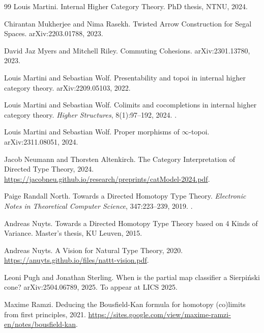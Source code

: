\documentclass[12pt]{article}
\begin{document}
\begin{thebibliography}{99}
Louis Martini.
\newblock Internal Higher Category Theory.
\newblock PhD thesis, NTNU, 2024.

Chirantan Mukherjee and Nima Rasekh.
\newblock Twisted Arrow Construction for Segal Spaces.
\newblock arXiv:2203.01788, 2023.

David Jaz Myers and Mitchell Riley.
\newblock Commuting Cohesions.
\newblock arXiv:2301.13780, 2023.

Louis Martini and Sebastian Wolf.
\newblock Presentability and topoi in internal higher category theory.
\newblock arXiv:2209.05103, 2022.

Louis Martini and Sebastian Wolf.
\newblock Colimits and cocompletions in internal higher category theory.
\newblock \emph{Higher Structures}, 8(1):97--192, 2024.
\newblock {}.

Louis Martini and Sebastian Wolf.
\newblock Proper morphisms of $\infty$-topoi.
\newblock arXiv:2311.08051, 2024.

Jacob Neumann and Thorsten Altenkirch.
\newblock The Category Interpretation of Directed Type Theory, 2024.
\newblock \url{https://jacobneu.github.io/research/preprints/catModel-2024.pdf}.

Paige Randall North.
\newblock Towards a Directed Homotopy Type Theory.
\newblock \emph{Electronic Notes in Theoretical Computer Science}, 347:223--239, 2019.
\newblock {}.

Andreas Nuyts.
\newblock Towards a Directed Homotopy Type Theory based on 4 Kinds of Variance.
\newblock Master's thesis, KU Leuven, 2015.

Andreas Nuyts.
\newblock A Vision for Natural Type Theory, 2020.
\newblock \url{https://anuyts.github.io/files/nattt-vision.pdf}.

Leoni Pugh and Jonathan Sterling.
\newblock When is the partial map classifier a Sierpiński cone?
\newblock arXiv:2504.06789, 2025. To appear at LICS 2025.

Maxime Ramzi.
\newblock Deducing the Bousfield-Kan formula for homotopy (co)limits from first principles, 2021.
\newblock \url{https://sites.google.com/view/maxime-ramzi-en/notes/bousfield-kan}.


\end{thebibliography}
\end{document}
